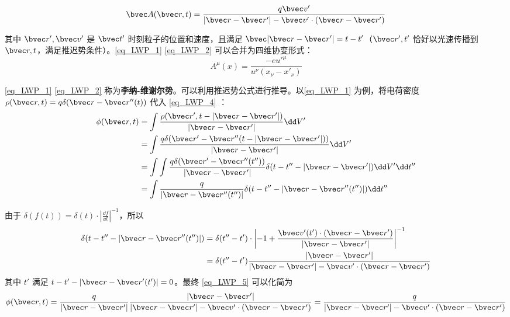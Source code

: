 \begin{equation}\label{eq_LWP_2}
\bvec A(\bvec r,t)=\frac{q\bvec v'}{|\bvec r-\bvec r'|-\bvec v'\cdot (\bvec r-\bvec r')}
\end{equation}

其中 $\bvec r',\bvec v'$ 是 $\bvec t'$ 时刻粒子的位置和速度，且满足 $\bvec |\bvec r-\bvec r'|=t-t'$（$\bvec r',t'$ 恰好以光速传播到 $\bvec r,t$，满足推迟势条件）。\autoref{eq_LWP_1} \autoref{eq_LWP_2} 可以合并为四维协变形式：
\begin{equation}
A^\mu(x)=\frac{-e u'^\mu}{u^\nu (x_\nu-x'_\nu)}
\end{equation}

\autoref{eq_LWP_1} \autoref{eq_LWP_2} 称为\textbf{李纳-维谢尔势}。可以利用推迟势公式进行推导。以\autoref{eq_LWP_1} 为例，将电荷密度 $\rho(\bvec r,t)=q\delta(\bvec r-\bvec r''(t))$ 代入 
\autoref{eq_LWP_4} ：
\begin{equation}\label{eq_LWP_5}
\begin{aligned}
\phi(\bvec r,t)&=\int \frac{\rho(\bvec r',t-|\bvec r-\bvec r'|)}{|\bvec r-\bvec r'|}\dd V'\\
&=\int \frac{q\delta(\bvec r'-\bvec r''(t-|\bvec r-\bvec r'|))}{|\bvec r-\bvec r'|}\dd V'\\
&=\int \int \frac{q\delta(\bvec r'-\bvec r''(t''))}{|\bvec r-\bvec r'|}\delta (t-t''-|\bvec r-\bvec r'|)\dd V'\dd t''\\
&=\int \frac{q}{|\bvec r-\bvec r''(t'')|}\delta (t-t''-|\bvec r-\bvec r''(t'')|)\dd t''
\end{aligned}\\
\end{equation}

由于 $\delta(f(t))=\delta(t)\cdot \left|\frac{\dd f}{\dd t}\right|^{-1}$，所以
\begin{equation}
\begin{aligned}
\delta (t-t''-|\bvec r-\bvec r''(t'')|)&=\delta(t''-t')\cdot \left|-1+\frac{\bvec v'(t')\cdot (\bvec r-\bvec r')}{|\bvec r-\bvec r'|}\right|^{-1}\\
&=\delta(t''-t')\frac{|\bvec r-\bvec r'|}{|\bvec r-\bvec r'|-\bvec v'\cdot (\bvec r-\bvec r')}
\end{aligned}
\end{equation}
其中 $t'$ 满足 $t-t'-|\bvec r-\bvec r'(t')|=0$。最终 \autoref{eq_LWP_5} 可以化简为
\begin{equation}
\phi(\bvec r,t)=\frac{q}{|\bvec r-\bvec r'|}\frac{|\bvec r-\bvec r'|}{|\bvec r-\bvec r'|-\bvec v'\cdot (\bvec r-\bvec r')}=\frac{q}{|\bvec r-\bvec r'|-\bvec v'\cdot (\bvec r-\bvec r')}
\end{equation}

